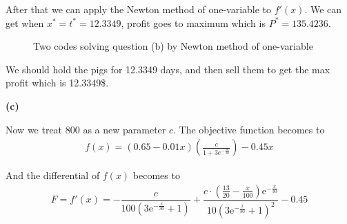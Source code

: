 \documentclass{report}
\begin{document}
\begin{spacing}{1.3541667}
After that we can apply the Newton method of one-variable to $f'(x)$. 
We can get when $x^*=t^* =12.3349$, profit goes to maximum which is $P^*=135.4236$. 

\begin{figure}[htbp]
    \centering
    \hspace{0.1in}
    \caption*{Two codes solving question (b) by Newton method of one-variable}
\end{figure}

\vspace{1em}
\hspace{-1.5em}{\bf Step 5. Answer the question}\par

We should hold the pigs for 12.3349 days, and then sell them to get the max profit which is 12.3349\$. 

\newpage

{\bf (c)}\par
Now we treat 800 as a new parameter $c$. 
The objective function becomes to
\begin{align*}
    f(x)=(0.65-0.01x)(\frac{c}{1+3e^{-\frac{x}{30}}})-0.45x
\end{align*}

And the differential of $f(x)$ becomes to 
\begin{align*}
    F=f'(x)=-\dfrac{c}{100\left(3\mathrm{e}^{-\frac{x}{30}}+1\right)}+\dfrac{c\cdot\left(\frac{13}{20}-\frac{x}{100}\right)\mathrm{e}^{-\frac{x}{30}}}{10{(3\mathrm{e}^{-\frac{x}{30}}+1)}^2}-0.45
\end{align*}


\end{spacing}
\end{document}
